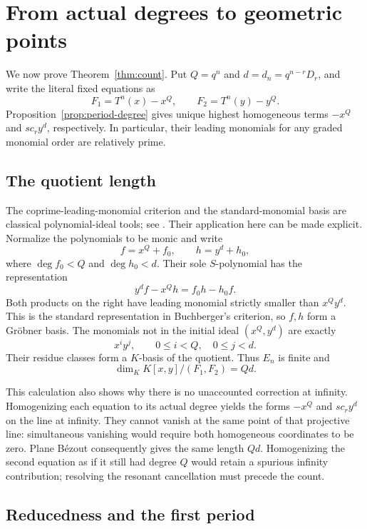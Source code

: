 \section{From actual degrees to geometric points}\label{sec:count}

We now prove Theorem~\ref{thm:count}. Put $Q=q^n$ and
$d=d_n=q^{n-r}D_r$, and write the literal fixed equations as
\[
 F_1=T^n(x)-x^Q,\qquad F_2=T^n(y)-y^Q.
\]
Proposition~\ref{prop:period-degree} gives unique highest homogeneous
terms $-x^Q$ and $s c_r y^d$, respectively. In particular, their
leading monomials for any graded monomial order are relatively prime.

\subsection{The quotient length}

The coprime-leading-monomial criterion and the standard-monomial basis
are classical polynomial-ideal tools; see \cite{cox2015ideals}.
Their application here can be made explicit. Normalize the polynomials
to be monic and write
\[
 f=x^Q+f_0,\qquad h=y^d+h_0,
\]
where $\deg f_0<Q$ and $\deg h_0<d$. Their sole $S$-polynomial has
the representation
\[
 y^d f-x^Q h=f_0h-h_0f.
\]
Both products on the right have leading monomial strictly smaller
than $x^Qy^d$. This is the standard representation in Buchberger's
criterion, so $f,h$ form a Gr\"obner basis. The monomials not in the
initial ideal $(x^Q,y^d)$ are exactly
\begin{equation}\label{eq:rectangle}
 x^i y^j,\qquad 0\le i<Q,\quad 0\le j<d.
\end{equation}
Their residue classes form a $K$-basis of the quotient. Thus $E_n$
is finite and
\begin{equation}\label{eq:length}
 \dim_K K[x,y]/(F_1,F_2)=Qd.
\end{equation}

This calculation also shows why there is no unaccounted correction at
infinity. Homogenizing each equation to its actual degree yields the
forms $-x^Q$ and $s c_r y^d$ on the line at infinity. They cannot
vanish at the same point of that projective line: simultaneous
vanishing would require both homogeneous coordinates to be zero.
Plane B\'ezout consequently gives the same length $Qd$. Homogenizing
the second equation as if it still had degree $Q$ would retain a
spurious infinity contribution; resolving the resonant cancellation
must precede the count.

\subsection{Reducedness and the first period}


